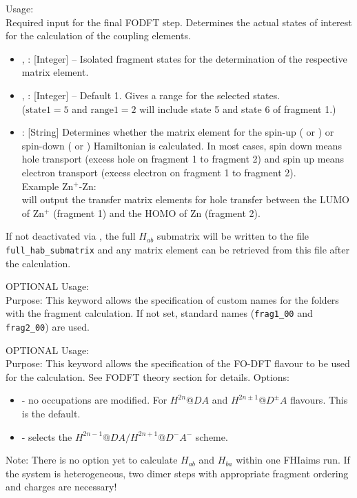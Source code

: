{
  \noindent
  Usage:       \\[1.0ex]
  Required input for the final FODFT step. Determines the actual states of interest for the calculation of the coupling elements.
  \begin{itemize}
    \item {}, : [Integer] -- Isolated fragment states for the determination of the respective matrix element. 
    \item {}, : [Integer] -- Default 1. Gives a range for the selected states.\\[1.0ex]
      ($\text{state}1 = 5$ and $\text{range}1 = 2$ will include state 5 and state 6 of fragment 1.)
    \item {}: [String] Determines whether the matrix element for the spin-up ( or ) or spin-down ( or ) Hamiltonian is calculated. In most cases, spin down means hole transport (excess hole on fragment 1 to fragment 2) and spin up means electron transport (excess electron on fragment 1 to fragment 2).\\[1.0ex]
Example Zn$^+$-Zn:       \\
will output the transfer matrix elements for hole transfer between the LUMO of Zn$^+$ (fragment 1) and the HOMO of Zn (fragment 2).
  \end{itemize}
  If not deactivated via  , the full $H_{ab}$ submatrix will be written to the file \texttt{full\_hab\_submatrix} and any matrix element can be retrieved from this file after the calculation.  
}

{
  \noindent
  OPTIONAL Usage:    \\[1.0ex]
  Purpose: This keyword allows the specification of custom names for the folders with the fragment calculation. If not set, standard names (\texttt{frag1\_00} and \texttt{frag2\_00}) are used. 
}

{
  \noindent
  OPTIONAL Usage:   \\[1.0ex]
  Purpose: This keyword allows the specification of the FO-DFT flavour to be used for the calculation. See FODFT theory section for details.
  Options: 
  \begin{itemize}
    \item {} - no occupations are modified. For $H^{2n}@DA$ and $H^{2n \pm 1}@D^\pm A$ flavours. This is the default.
    \item {} - selects the $H^{2n-1}@DA / H^{2n+1}@D^-A^-$ scheme.
  \end{itemize}
  Note: There is no option yet to calculate $H_{ab}$ and $H_{ba}$ within one FHIaims run. If the system is heterogeneous, two dimer steps with appropriate fragment ordering and charges are necessary!
}

